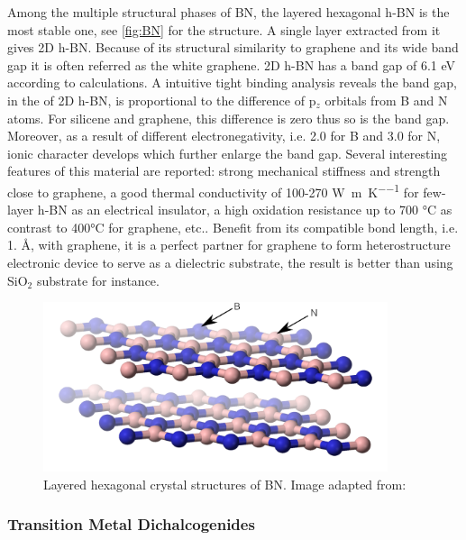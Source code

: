 Among the multiple structural phases of BN, the layered hexagonal h-BN is the most stable one, see \autoref{fig:BN} for the structure. A single layer extracted from it gives 2D h-BN. Because of its structural similarity to graphene and its wide band gap it is often referred as the white graphene\cite{alem2009atomically}. 2D h-BN has a band gap of 6.1 eV according to calculations. A intuitive tight binding analysis reveals the band gap, in the of 2D h-BN, is proportional to the difference of p$_z$ orbitals from B and N atoms. For silicene and graphene, this difference is zero thus so is the band gap. Moreover, as a result of different electronegativity, i.e. 2.0 for B and 3.0 for N, ionic character develops which further enlarge the band gap\cite{zhuang2012}. Several interesting features of this material are reported: strong mechanical stiffness and strength close to graphene\cite{Bosak2006}, a good thermal conductivity of 100-270 \si{\watt\per\meter\per\kelvin} for few-layer h-BN\cite{Jo2013} as an electrical insulator, a high oxidation resistance up to 700 \si{\celsius} as contrast to 400\si{\celsius} for graphene\cite{li2016atomically}, etc.. Benefit from its compatible bond length, i.e. 1. \AA, with graphene, it is a perfect partner for graphene to form heterostructure electronic device to serve as a dielectric substrate\cite{Lee2013}, the result is better than using SiO$_2$ substrate\cite{dean2010boron} for instance. 


\begin{figure}[htbp!] 
\centering  
\includegraphics[width=0.9\textwidth]{BN.png}
\caption{Layered hexagonal crystal structures of BN. Image adapted from:\cite{Benjah2007}}  
\label{fig:BN}
\end{figure} 


\subsubsection{Transition Metal Dichalcogenides}

